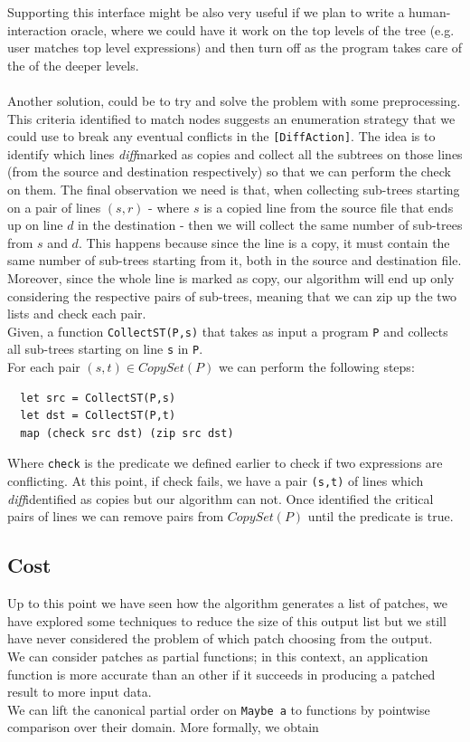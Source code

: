 \documentclass[11pt, titlepage]{article}
\newcommand{\toHaskell}[1]{\texttt{#1}\xspace}
\newcommand{\diff}{\emph{diff}}
\begin{document}
Supporting this interface might be also very useful if we plan to write a human-interaction oracle, where we could have it work on the top levels of the tree (e.g. user matches top level expressions) and then turn off as the program takes care of the of the deeper levels. 
\\
\\
Another solution, could be to try and solve the problem with some preprocessing.
\\
This criteria identified to match nodes suggests an enumeration strategy that we could use to break any eventual conflicts in the \texttt{[DiffAction]}. 
The idea is to identify which lines \diff marked as copies and collect all the subtrees on those lines (from the source and destination respectively) so that we can perform the check on them.
The final observation we need is that, when collecting sub-trees starting on a pair of lines $(s,r)$ - where $s$ is a copied line from the source file that ends up on line $d$ in the destination - then we will collect the same number of sub-trees from $s$ and $d$. This happens because since the line is a copy, it must 
contain the same number of sub-trees starting from it, both in the source and destination file. 
\\
Moreover, since the whole line is marked as copy, our algorithm will end up only considering the respective pairs of sub-trees, meaning that we can zip up the two lists and check each pair. 
\\
Given, a function \toHaskell{CollectST(P,s)} that takes as input a program \toHaskell{P} and collects all sub-trees starting on line \toHaskell{s} in \toHaskell{P}. 
\\
For each pair $(s,t) \in CopySet(P)$ we can perform the following steps:
\begin{verbatim}
  let src = CollectST(P,s)
  let dst = CollectST(P,t)
  map (check src dst) (zip src dst) 
\end{verbatim}

Where \texttt{check} is the predicate we defined earlier to check if two expressions are conflicting.
At this point, if check fails, we have a pair \texttt{(s,t)} of lines which \diff identified as copies but our algorithm can not. 
Once identified the critical pairs of lines we can remove pairs from $CopySet(P)$ until the predicate is true. 

\subsection{Cost}\label{cost}
Up to this point we have seen how the algorithm generates a list of patches, we have explored some techniques to reduce the size of this output list but we still have never considered the problem of which patch choosing from the output.
\\
We can consider patches as partial functions; in this context, an application function is more accurate than an other if it succeeds in producing a patched result to more input data.
\\
We can lift the canonical partial order on \texttt{Maybe a} to functions by pointwise comparison over their domain. More formally, we obtain
\end{document}
